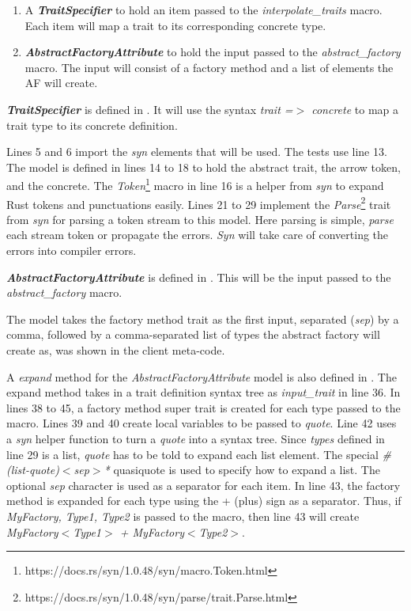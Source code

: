 \begin{enumerate}
	\item A \textbf{\textit{TraitSpecifier}} to hold an item passed to the \textit{interpolate\_traits} macro.
	      Each item will map a trait to its corresponding concrete type.
	\item \textbf{\textit{AbstractFactoryAttribute}} to hold the input passed to the \textit{abstract\_factory} macro.
	      The input will consist of a factory method and a list of elements the AF will create.
\end{enumerate}

\textbf{\textit{TraitSpecifier}} is defined in .
It will use the syntax \textit{trait =$>$ concrete} to map a trait type to its concrete definition.

Lines 5 and 6 import the \textit{syn} elements that will be used.
The tests use line 13.
The model is defined in lines 14 to 18 to hold the abstract trait, the arrow token, and the concrete.
The \textit{Token}\footnote{https://docs.rs/syn/1.0.48/syn/macro.Token.html} macro in line 16 is a helper from \textit{syn} to expand Rust tokens and punctuations easily.
Lines 21 to 29 implement the \textit{Parse}\footnote{https://docs.rs/syn/1.0.48/syn/parse/trait.Parse.html} trait from \textit{syn} for parsing a token stream to this model.
Here parsing is simple, \textit{parse} each stream token or propagate the errors.
\textit{Syn} will take care of converting the errors into compiler errors.

\textbf{\textit{AbstractFactoryAttribute}} is defined in .
This will be the input passed to the \textit{abstract\_factory} macro.

The model takes the factory method trait as the first input, separated (\textit{sep}) by a comma, followed by a comma-separated list of types the abstract factory will create as, was shown in the client meta-code.

A \textit{expand} method for the \textit{AbstractFactoryAttribute} model is also defined in .
The expand method takes in a trait definition syntax tree as \textit{input\_trait} in line 36.
In lines 38 to 45, a factory method super trait is created for each type passed to the macro.
Lines 39 and 40 create local variables to be passed to \textit{quote}.
Line 42 uses a \textit{syn} helper function to turn a \textit{quote} into a syntax tree.
Since \textit{types} defined in line 29 is a list, \textit{quote} has to be told to expand each list element.
The special \textit{\#(list-quote)$<$sep$>$*} quasiquote is used to specify how to expand a list.
The optional \textit{sep} character is used as a separator for each item.
In line 43, the factory method is expanded for each type using the + (plus) sign as a separator.
Thus, if \textit{MyFactory, Type1, Type2} is passed to the macro, then line 43 will create \textit{MyFactory$<$Type1$>$ + MyFactory$<$Type2$>$}.

